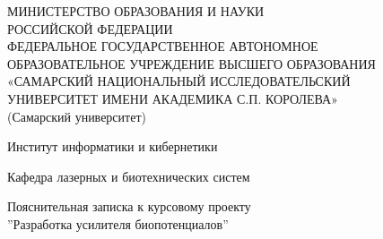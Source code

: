 \begin{titlepage}
\newpage
\begin{doublespace}
\begin{center}
МИНИСТЕРСТВО ОБРАЗОВАНИЯ И НАУКИ \\
РОССИЙСКОЙ ФЕДЕРАЦИИ\\
ФЕДЕРАЛЬНОЕ ГОСУДАРСТВЕННОЕ АВТОНОМНОЕ\\
ОБРАЗОВАТЕЛЬНОЕ УЧРЕЖДЕНИЕ ВЫСШЕГО ОБРАЗОВАНИЯ\\
«САМАРСКИЙ НАЦИОНАЛЬНЫЙ ИССЛЕДОВАТЕЛЬСКИЙ\\
УНИВЕРСИТЕТ ИМЕНИ АКАДЕМИКА С.П. КОРОЛЕВА»	\\
(Самарский университет) \\
\end{center}

\vspace{4em}

\begin{center}
Институт информатики и кибернетики \\ 
\end{center}

\begin{center}
Кафедра лазерных и биотехнических систем \\ 
\end{center}


\vspace{3em}

\begin{center}
{Пояснительная записка к курсовому проекту\\''Разработка усилителя биопотенциалов''}
\end{center}

\vspace{9em}






\end{doublespace}
\end{titlepage}
